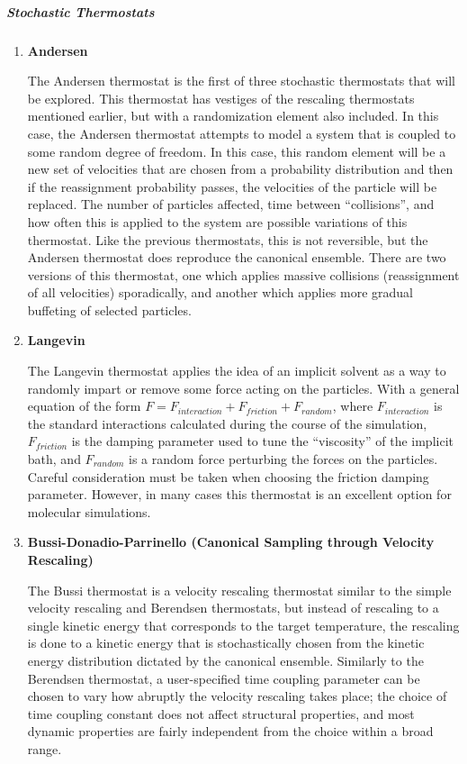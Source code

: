 \documentclass[9pt,bestpractices]{livecoms}
\begin{document}
\subparagraph{Stochastic Thermostats}
\begin{enumerate}[listparindent=\parindent]
    \item \textbf{Andersen}

        The Andersen\cite{andersen1980molecular} thermostat is the first of three stochastic thermostats that will be explored.
        This thermostat has vestiges of the rescaling thermostats mentioned earlier, but with a randomization element also included.  In this case, the Andersen thermostat attempts to model a system that is coupled to some random degree of freedom\cite{andersen1980molecular, thermostatAlgorithms2005}.
        In this case, this random element will be a new set of velocities that are chosen from a probability distribution and then if the reassignment probability passes, the velocities of the particle will be replaced.
        The number of particles affected, time between ``collisions'', and how often this is applied to the system are possible variations of this thermostat.
        Like the previous thermostats, this is not reversible, but the Andersen thermostat does reproduce the canonical ensemble.
        There are two versions of this thermostat, one which applies massive collisions (reassignment of all velocities) sporadically, and another which applies more gradual buffeting of selected particles.
    
    \item \textbf{Langevin}

        The Langevin\cite{schneider1978molecular} thermostat applies the idea of an implicit solvent as a way to randomly impart or remove some force acting on the particles. 
        With a general equation of the form $F = F_{interaction} + F_{friction} + F_{random}$, where $F_{interaction}$ is the standard interactions calculated during the course of the simulation, $F_{friction}$ is the damping parameter used to tune the  ``viscosity'' of the implicit bath, and $F_{random}$ is a random force perturbing the forces on the particles. 
        Careful consideration must be taken when choosing the friction damping parameter.
        However, in many cases this thermostat is an excellent option for molecular simulations.

    \item \textbf{Bussi-Donadio-Parrinello (Canonical Sampling through Velocity Rescaling)}

        The Bussi\cite{Bussi:2007:JChemPhys:Canonical} thermostat is a velocity rescaling thermostat similar to the simple velocity rescaling and Berendsen thermostats, but instead of rescaling to a single kinetic energy that corresponds to the target temperature, the rescaling is done to a kinetic energy that is stochastically chosen from the kinetic energy distribution dictated by the canonical ensemble.
        Similarly to the Berendsen thermostat, a user-specified time coupling parameter can be chosen to vary how abruptly the velocity rescaling takes place; the choice of time coupling constant does not affect structural properties, and most dynamic properties are fairly independent from the choice within a broad range.

\end{enumerate}
\end{document}
